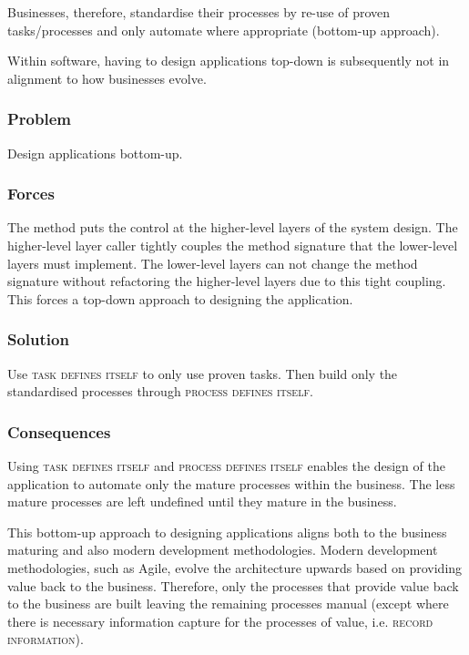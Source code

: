 \documentclass[prodmode]{style/acmlarge}
\begin{document}
Businesses, therefore, standardise their processes by re-use of proven
tasks/processes and only automate where appropriate (bottom-up approach).

Within software, having to design applications top-down is subsequently
not in alignment to how businesses evolve.

\subsubsection*{Problem} Design applications bottom-up.

\subsubsection*{Forces} The method puts the control at the higher-level layers
of the system design.  The higher-level layer caller tightly couples the method
signature that the lower-level layers must implement.  The lower-level layers
can not change the method signature without refactoring the higher-level layers
due to this tight coupling.  This forces a top-down approach to designing the
application.

\subsubsection*{Solution} Use \textsc{task defines itself} to only use proven
tasks.  Then build only the standardised processes through \textsc{process
defines itself}.

\subsubsection*{Consequences} Using \textsc{task defines itself} and
\textsc{process defines itself} enables the design of the application to
automate only the mature processes within the business.  The less mature
processes are left undefined until they mature in the business.

This bottom-up approach to designing applications aligns both to the business
maturing and also modern development methodologies.  Modern development
methodologies, such as Agile, evolve the architecture upwards based on providing
value back to the business.  Therefore, only the processes that provide value
back to the business are built leaving the remaining processes manual (except
where there is necessary information capture for the processes of value, i.e.
\textsc{record information}).
\end{document}
